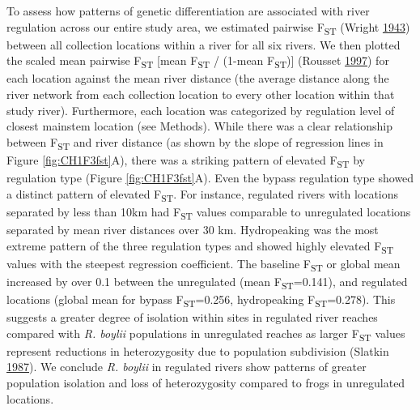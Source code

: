 \documentclass[proquest,12pt,final]{ucthesis-CA2012} %
\begin{document}
\begin{ucmainmatter}
To assess how patterns of genetic differentiation are associated with
river regulation across our entire study area, we estimated pairwise
F\textsubscript{ST} (Wright
\protect\hyperlink{ref-wright_isolation_1943}{1943}) between all
collection locations within a river for all six rivers. We then plotted
the scaled mean pairwise F\textsubscript{ST} {[}mean F\textsubscript{ST}
/ (1-mean F\textsubscript{ST}){]} (Rousset
\protect\hyperlink{ref-rousset_genetic_1997}{1997}) for each location
against the mean river distance (the average distance along the river
network from each collection location to every other location within
that study river). Furthermore, each location was categorized by
regulation level of closest mainstem location (see Methods). While there
was a clear relationship between F\textsubscript{ST} and river distance
(as shown by the slope of regression lines in Figure
\ref{fig:CH1F3fst}A), there was a striking pattern of elevated
F\textsubscript{ST} by regulation type (Figure \ref{fig:CH1F3fst}A).
Even the bypass regulation type showed a distinct pattern of elevated
F\textsubscript{ST}. For instance, regulated rivers with locations
separated by less than 10km had F\textsubscript{ST} values comparable to
unregulated locations separated by mean river distances over 30 km.
Hydropeaking was the most extreme pattern of the three regulation types
and showed highly elevated F\textsubscript{ST} values with the steepest
regression coefficient. The baseline F\textsubscript{ST} or global mean
increased by over 0.1 between the unregulated (mean
F\textsubscript{ST}=0.141), and regulated locations (global mean for
bypass F\textsubscript{ST}=0.256, hydropeaking
F\textsubscript{ST}=0.278). This suggests a greater degree of isolation
within sites in regulated river reaches compared with \emph{R. boylii}
populations in unregulated reaches as larger F\textsubscript{ST} values
represent reductions in heterozygosity due to population subdivision
(Slatkin \protect\hyperlink{ref-slatkin_gene_1987}{1987}). We conclude
\emph{R. boylii} in regulated rivers show patterns of greater population
isolation and loss of heterozygosity compared to frogs in unregulated
locations.


\end{ucmainmatter}
\end{document}
